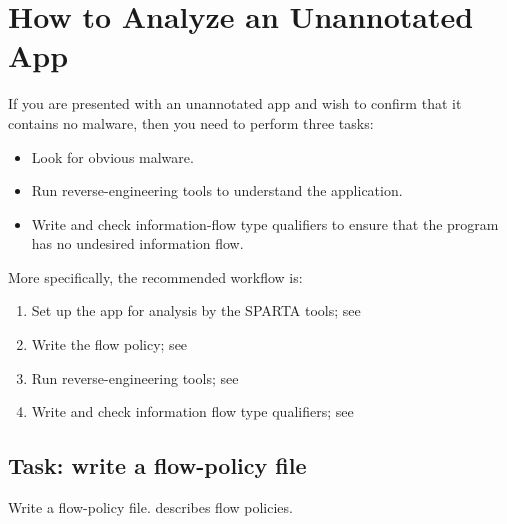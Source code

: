 \htmlhr
\chapter{How to Analyze an Unannotated App\label{analyze-unannotated-app}}

If you are presented with an unannotated app and wish to confirm that it
contains no malware, then you need to perform three tasks:
\begin{itemize}
\item
  Look for obvious malware.
\item
  Run reverse-engineering tools to understand the application.
\item
  Write and check information-flow type qualifiers to ensure that the
  program has no undesired information flow.
\end{itemize}


More specifically, the recommended workflow is:

\begin{enumerate}
\item Set up the app for analysis by the SPARTA tools; see 
\item Write the flow policy; see 
\item Run reverse-engineering tools; see 
\item Write and check information flow type qualifiers; see 
\end{enumerate}

% 
% 




\section{Task: write a flow-policy file\label{sec:write-flow-policy}}

Write a flow-policy file.   describes flow policies.

